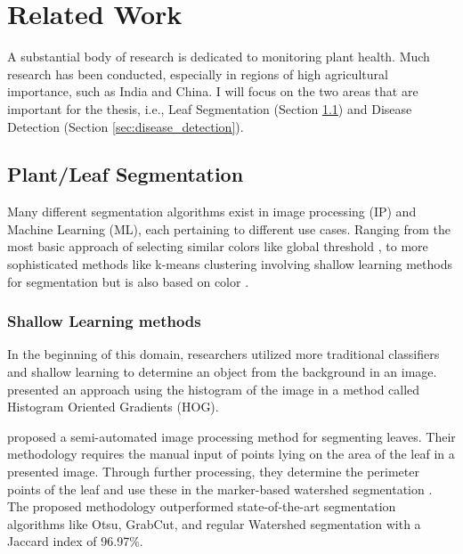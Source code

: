 \documentclass[draft,final]{vutinfth} %
\begin{document}
\chapter{Related Work} \label{sec:related_work}
A substantial body of research is dedicated to monitoring plant health. Much research has been conducted, especially in regions of high agricultural importance, such as India and China. I will focus on the two areas that are important for the thesis, i.e., Leaf Segmentation (Section \ref{sec:leaf_seg}) and Disease Detection (Section \ref{sec:disease_detection}).

\section{Plant/Leaf Segmentation} \label{sec:leaf_seg}

Many different segmentation algorithms exist in image processing (IP) and Machine Learning (ML), each pertaining to different use cases. Ranging from the most basic approach of selecting similar colors like global threshold \cite{lu_chapter_2024}, to more sophisticated methods like k-means clustering involving shallow learning methods for segmentation but is also based on color \cite{dhanachandra_image_2015}.

\subsection{Shallow Learning methods}
In the beginning of this domain, researchers utilized more traditional classifiers and shallow learning to determine an object from the background in an image. \cite{lowe_distinctive_2004} presented an approach using the histogram of the image in a method called Histogram Oriented Gradients (HOG). 

\cite{gao_method_2018} proposed a semi-automated image processing method for segmenting leaves. Their methodology requires the manual input of points lying on the area of the leaf in a presented image. Through further processing, they determine the perimeter points of the leaf and use these in the marker-based watershed segmentation \cite{kornilov_review_2022}. The proposed methodology outperformed state-of-the-art segmentation algorithms like Otsu, GrabCut, and regular Watershed segmentation with a Jaccard index of 96.97\%.
\end{document}
